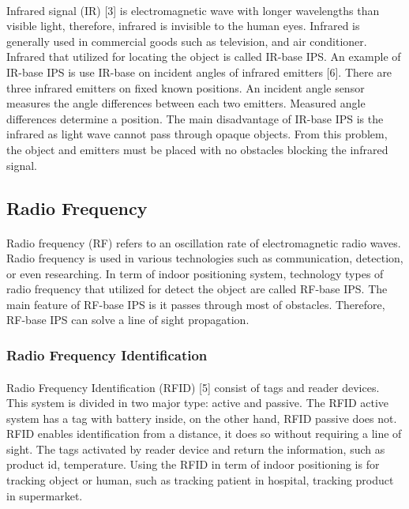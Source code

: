 \paragraph{} Infrared signal (IR) [3] is electromagnetic wave with longer wavelengths than visible light, therefore, infrared is invisible to the human eyes. Infrared is generally used in commercial goods such as television, and air conditioner. Infrared that utilized for locating the object is called IR-base IPS. An example of IR-base IPS is use IR-base on incident angles of infrared emitters [6]. There are three infrared emitters on fixed known positions. An incident angle sensor measures the angle differences between each two emitters. Measured angle differences determine a position. The main disadvantage of IR-base IPS is the infrared as light wave cannot pass through opaque objects. From this problem, the object and emitters must be placed with no obstacles blocking the infrared signal.

\subsection{Radio Frequency}
\paragraph{} Radio frequency (RF) refers to an oscillation rate of electromagnetic radio waves. Radio frequency is used in various technologies such as communication, detection, or even researching. In term of indoor positioning system, technology types of radio frequency that utilized for detect the object are called RF-base IPS. The main feature of RF-base IPS is it passes through most of obstacles. Therefore, RF-base IPS can solve a line of sight propagation.

\subsubsection{Radio Frequency Identification}
\paragraph{} Radio Frequency Identification (RFID) [5] consist of tags and reader devices. This system is divided in two major type: active and passive. The RFID active system has a tag with battery inside, on the other hand, RFID passive does not. RFID enables identification from a distance, it does so without requiring a line of sight. The tags activated by reader device and return the information, such as product id, temperature. Using the RFID in term of indoor positioning is for tracking object or human, such as tracking patient in hospital, tracking product in supermarket.

